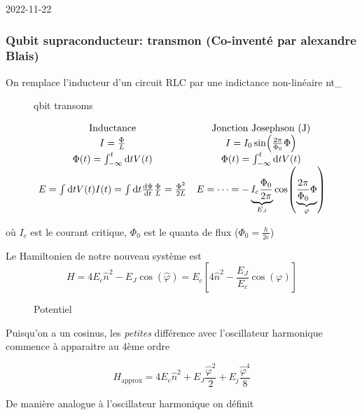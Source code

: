 


2022-11-22

\setcounter{section}{4}
\setcounter{subsection}{3}
\setcounter{subsubsection}{3}



\subsubsection{Qubit supraconducteur: transmon (Co-inventé par alexandre Blais)}


On remplace l'inducteur d'un circuit RLC par une indictance non-linéaire nt_\


\begin{figure}[ht]
    \centering
    \caption{qbit transoms}
    \label{fig:qbit-transoms}
\end{figure}


\[ \begin{matrix}
	\text{Inductance} & \text{Jonction Josephson (J)}\\
	I = \frac{\Phi}{L} & I = I_0 \sin(\frac{2\pi}{\Phi_0} \Phi)\\
	\Phi (t) = \int_{-\infty}^{t}\dd t V(t) & \Phi(t) = \int_{- \infty}^{t}\dd t V(t)\\
E = \int \dd t V(t) I(t)= \int \dd t \dv{\Phi}{t} \frac{\Phi}{L} = \frac{\Phi^{2}}{2L} & E = \dotsb = -\underbrace{I_c \frac{\Phi_{0}}{2\pi}}_{E_J}   \cos(\underbrace{\frac{2\pi}{\Phi_0} \Phi}_{\varphi} )
\end{matrix} \]

où $I_c$ est le courant critique, $	\Phi_0$ est le quanta de flux ($\Phi_0 = \frac{h}{2e} $)



Le Hamiltonien de notre nouveau système est \[ H = 4 E_c \hat n^{2}-E_J \cos(\hat \varphi) = E_c \left[ 4 \hat n^{2}- \frac{E_J}{E_c} \cos(\varphi) \right]  \]


\begin{figure}[ht]
    \centering
    \caption{Potentiel}
    \label{fig:potentiel}
\end{figure}


Puisqu'on a un cosinus, les \textit{petites} différence avec l'oscillateur harmonique commence à apparaitre au 4ème ordre

\[ H_{\text{approx}} = 4 E_c \hat n^{2}+ E_J \frac{\hat\varphi^2}{2} + E_j \frac{\hat\varphi^{4}}{8}  \]


De manière analogue à l'oscillateur harmonique on définit

